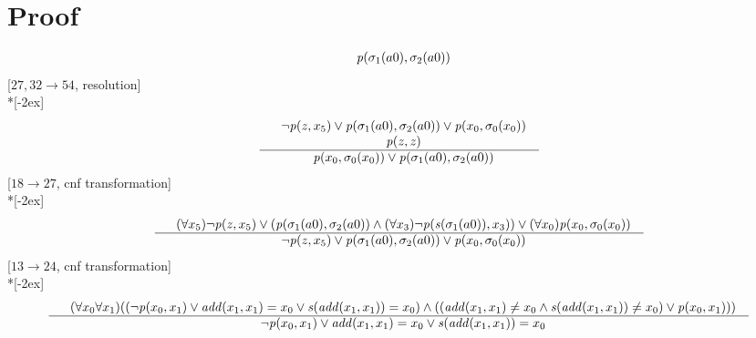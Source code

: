 \documentclass[fleqn]{article}
\newenvironment{VampireProof}{%
   \section{Proof}}{}
\newenvironment{VampireInference}{%
   \begin{array}{c}}{\end{array}}
\newenvironment{VampirePremise}%
   {\begin{array}{l}}%
   {\end{array}}
\newenvironment{VampireConclusion}%
   {\begin{array}{l}}%
   {\end{array}}
\newcommand{\VPremiseSeparator}{\\}
\newcommand{\VConclusionSeparator}{\\ \hline}
\newcommand{\Vor}{\vee}
\newcommand{\Vand}{\wedge}
\begin{document}
\begin{VampireProof}
\[\begin{VampireInference}
\begin{VampireConclusion}
~~\mathit{p} (\sigma_{1}(a0),\sigma_{2}(a0))
\end{VampireConclusion}
\end{VampireInference}
\]
[$27,32\rightarrow 54$, resolution]\\*[-2ex]
\[\begin{VampireInference}
\begin{VampirePremise}%
~~\neg \mathit{p} (\mathit{z},x_{5}) \Vor \mathit{p} (\sigma_{1}(a0),\sigma_{2}(a0)) \Vor \mathit{p} (x_{0},\sigma_{0}(x_{0}))
\end{VampirePremise}
\VPremiseSeparator
\begin{VampirePremise}%
~~\mathit{p} (\mathit{z},\mathit{z})
\end{VampirePremise}
\VConclusionSeparator
\begin{VampireConclusion}
~~\mathit{p} (x_{0},\sigma_{0}(x_{0})) \Vor \mathit{p} (\sigma_{1}(a0),\sigma_{2}(a0))
\end{VampireConclusion}
\end{VampireInference}
\]
[$18\rightarrow 27$, cnf transformation]\\*[-2ex]
\[\begin{VampireInference}
\begin{VampirePremise}%
~~(\forall x_{5} )\neg \mathit{p} (\mathit{z},x_{5}) \Vor (\mathit{p} (\sigma_{1}(a0),\sigma_{2}(a0)) \Vand (\forall x_{3} )\neg \mathit{p} (\mathit{s} (\sigma_{1}(a0)),x_{3})) \Vor (\forall x_{0} )\mathit{p} (x_{0},\sigma_{0}(x_{0}))
\end{VampirePremise}
\VConclusionSeparator
\begin{VampireConclusion}
~~\neg \mathit{p} (\mathit{z},x_{5}) \Vor \mathit{p} (\sigma_{1}(a0),\sigma_{2}(a0)) \Vor \mathit{p} (x_{0},\sigma_{0}(x_{0}))
\end{VampireConclusion}
\end{VampireInference}
\]
[$13\rightarrow 24$, cnf transformation]\\*[-2ex]
\[\begin{VampireInference}
\begin{VampirePremise}%
~~(\forall x_{0} \forall x_{1} )((\neg \mathit{p} (x_{0},x_{1}) \Vor \mathit{add} (x_{1},x_{1}) = x_{0} \Vor \mathit{s} (\mathit{add} (x_{1},x_{1})) = x_{0}) \Vand ((\mathit{add} (x_{1},x_{1}) \neq x_{0} \Vand \mathit{s} (\mathit{add} (x_{1},x_{1})) \neq x_{0}) \Vor \mathit{p} (x_{0},x_{1})))
\end{VampirePremise}
\VConclusionSeparator
\begin{VampireConclusion}
~~\neg \mathit{p} (x_{0},x_{1}) \Vor \mathit{add} (x_{1},x_{1}) = x_{0} \Vor \mathit{s} (\mathit{add} (x_{1},x_{1})) = x_{0}

\end{VampireConclusion}
\end{VampireInference}\]
\end{VampireProof}
\end{document}
